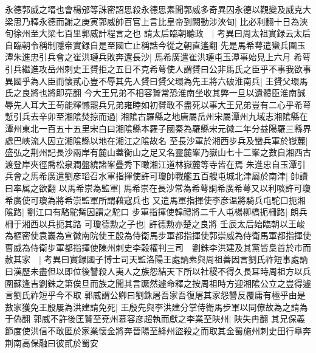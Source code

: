 永德郭威之壻也會楊邠等誅密詔思殺永德思素聞郭威多奇異囚永德以觀變及威克大梁思乃釋永德而謝之庚寅郭威帥百官上言比皇帝到闕動涉浹旬|{
	比必利翻十日為浹旬徐州至大梁七百里郭威計程言之也}
請太后臨朝聽政　|{
	考異曰周太祖實録云太后自臨朝令稱制隱帝實録自是至國亡止稱誥今從之朝直遙翻}
先是馬希萼遣蠻兵圍玉潭朱進忠引兵會之崔洪璉兵敗奔還長沙|{
	馬希廣遣崔洪璉屯玉潭事始見上六月}
希萼引兵繼進攻岳州刺史王贇拒之五日不克希萼使人謂贇曰公非馬氏之臣乎不事我欲事異國乎為人臣而懷貳心豈不辱其先人贇曰贇父環為先王將六破淮南兵|{
	王贇父環馬氏之良將也將即亮翻}
今大王兄弟不相容贇常恐淮南坐收其弊一旦以遺體臣淮南誠辱先人耳大王苟能釋憾罷兵兄弟雍睦如初贇敢不盡死以事大王兄弟豈有二心乎希萼慙引兵去辛卯至湘隂焚掠而過|{
	湘隂古羅縣之地唐屬岳州宋屬潭州九域志湘隂縣在潭州東北一百五十五里宋白曰湘隂縣本羅子國秦為羅縣宋元徽二年分益陽羅三縣界處巴峽流人因立湘隂縣以地在湘江之隂故名}
至長沙軍於湘西步兵及蠻兵軍於嶽麓|{
	盛弘之荆州記長沙兩岸有麓山蓋衡山之足又名靈麓峯乃嶽山七十二峯之數自湘西古渡登岸夾徑喬松泉澗盤繞諸峯疊秀下瞰湘江道林嶽麓等寺皆在焉}
朱進忠自玉潭引兵會之馬希廣遣劉彦瑫召水軍指揮使許可瓊帥戰艦五百艘屯城北津屬於南津|{
	帥讀曰率属之欲翻}
以馬希崇為監軍|{
	馬希崇在長沙常為希萼詷希廣希萼又以利啖許可瓊希廣使可瓊為將希崇監軍所謂藉寇兵也}
又遣馬軍指揮使李彦温將騎兵屯駝口扼湘隂路|{
	劉江口有駱駝觜因謂之駝口}
步軍指揮使韓禮將二千人屯楊柳橋扼柵路|{
	朗兵柵于湘西以兵扼其路}
可瓊德勲之子也|{
	許德勲亦楚之良將}
壬辰太后始臨朝以王峻為樞密使袁㠖為宣徽南院使王殷為侍衛馬步軍都指揮使郭崇威為侍衛馬軍都指揮使曹威為侍衛步軍都指揮使陳州刺史李穀權判三司　劉銖李洪建及其黨皆梟首於市而赦其家　|{
	考異曰實録國子博士司天監洛陽王處訥素與周祖善因言劉氏祚短事處訥曰漢歷未盡但以即位後讐殺人夷人之族怨結天下所以社稷不得久長耳時周祖方以兵圍蘇逢吉劉銖之第俟旦而族之聞其言蹶然遽命釋之按周祖時方迎湘隂公立之豈得遽言劉氏祚短乎今不取}
郭威謂公卿曰劉銖屠吾家吾復屠其家怨讐反覆庸有極乎由是數家獲免王殷屢為洪建請免死|{
	王殷先與李洪建分掌侍衛馬步軍以同僚故為之請為于偽翻}
郭威不許後匡贊至兗州慕容彦超執而獻之李業至陜州|{
	陜失冉翻}
其兄保義節度使洪信不敢匿於家業懷金將奔晉陽至絳州盜殺之而取其金蜀施州刺史田行臯奔荆南高保融曰彼貳於蜀安

